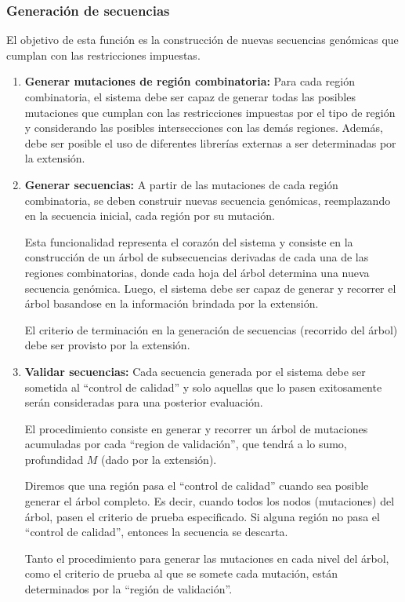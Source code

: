 \documentclass[10pt,a4paper]{article}
\begin{document}
  \subsubsection{Generaci\'on de secuencias}
  El objetivo de esta funci\'on es la construcci\'on de nuevas secuencias gen\'omicas que cumplan con las restricciones impuestas.
  \begin{enumerate}
    \item \textbf{Generar mutaciones de regi\'on combinatoria:}
    Para cada regi\'on combinatoria, el sistema debe ser capaz de generar todas las posibles mutaciones que cumplan con las restricciones impuestas por el tipo de regi\'on y considerando las posibles intersecciones con las dem\'as regiones. Adem\'as, debe ser posible el uso de diferentes librer\'ias externas a ser determinadas por la extensi\'on.
    
    \item \textbf{Generar secuencias:}
    A partir de las mutaciones de cada regi\'on combinatoria, se deben construir nuevas secuencia gen\'omicas, reemplazando en la secuencia inicial, cada regi\'on por su mutaci\'on.

    Esta funcionalidad representa el coraz\'on del sistema y consiste en la construcci\'on de un \'arbol de subsecuencias derivadas de cada una de las regiones combinatorias, donde cada hoja del \'arbol determina una nueva secuencia gen\'omica. Luego, el sistema debe ser capaz de generar y recorrer el \'arbol basandose en la informaci\'on brindada por la extensi\'on.

    El criterio de terminaci\'on en la generaci\'on de secuencias (recorrido del \'arbol) debe ser provisto por la extensi\'on.

    \item \textbf{Validar secuencias:}
    Cada secuencia generada por el sistema debe ser sometida al ``control de calidad'' y solo aquellas que lo pasen exitosamente ser\'an consideradas para una posterior evaluaci\'on.    

    El procedimiento consiste en generar y recorrer un \'arbol de mutaciones acumuladas por cada ``region de validaci\'on'', que tendr\'a a lo sumo, profundidad $M$ (dado por la extensi\'on). 

    Diremos que una regi\'on pasa el ``control de calidad'' cuando sea posible generar el \'arbol completo. Es decir, cuando todos los nodos (mutaciones) del \'arbol, pasen el criterio de prueba especificado. Si alguna regi\'on no pasa el ``control de calidad'', entonces la secuencia se descarta.

    Tanto el procedimiento para generar las mutaciones en cada nivel del \'arbol, como el criterio de prueba al que se somete cada mutaci\'on, est\'an determinados por la ``regi\'on de validaci\'on''.
  \end{enumerate}
\end{document}
